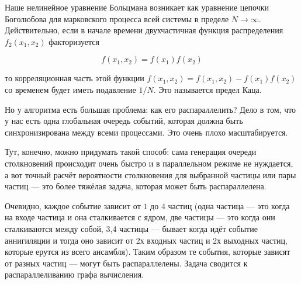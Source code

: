 Наше нелинейное уравнение Больцмана возникает как уравнение цепочки Боголюбова для марковского процесса всей системы в пределе $N \to \infty$.
Действительно, если в начале времени двухчастичная функция распределения $f_2(x_1,x_2)$ факторизуется 

\[
	f(x_1,x_2) = f(x_1) f(x_2)
\]

то корреляционная часть этой функции $f(x_1,x_2) = f(x_1,x_2) - f(x_1) f(x_2)$ со временем будет иметь подавление $1/N$. Это называется предел Каца.

Но у алгоритма есть большая проблема: как его распараллелить? Дело в том, что у нас есть одна глобальная очередь событий, которая должна быть синхронизирована между всеми процессами. Это очень плохо масштабируется.

Тут, конечно, можно придумать такой способ: сама генерация очереди столкновений происходит очень быстро и в параллельном режиме не нуждается, а вот точный расчёт вероятности столкновения для выбранной частицы или пары частиц --- это более тяжёлая задача, которая может быть распараллелена. 

Очевидно, каждое событие зависит от $1$ до $4$ частиц (одна частица --- это когда на входе частица и она сталкивается с ядром, две частицы --- это когда они сталкиваются между собой, 3,4 частицы --- бывает когда идёт событие аннигиляции и тогда оно зависит от 2х входных частиц и 2х выходных частиц, которые ерутся из всего ансамбля). Таким образом те события, которые зависят от разных частиц --- могут быть распараллелены. Задача сводится к распараллеливанию графа вычисления.

